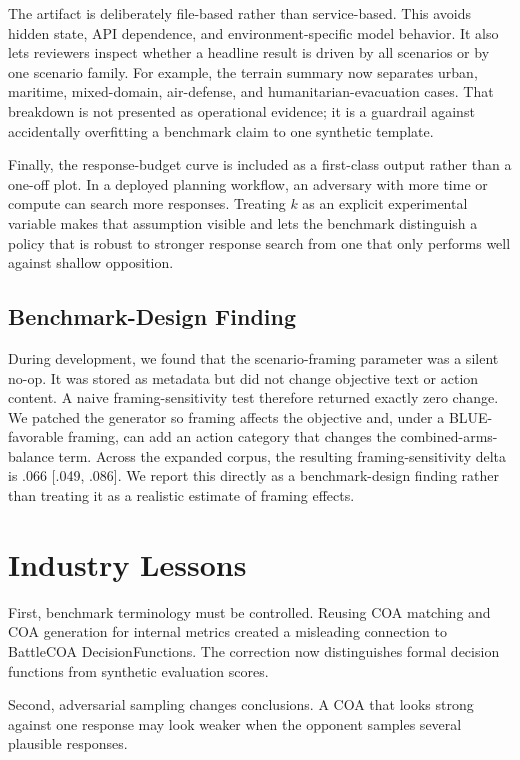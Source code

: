 \documentclass[sigconf]{acmart}
\begin{document}
The artifact is deliberately file-based rather than service-based. This avoids hidden state, API dependence, and environment-specific model behavior. It also lets reviewers inspect whether a headline result is driven by all scenarios or by one scenario family. For example, the terrain summary now separates urban, maritime, mixed-domain, air-defense, and humanitarian-evacuation cases. That breakdown is not presented as operational evidence; it is a guardrail against accidentally overfitting a benchmark claim to one synthetic template.

Finally, the response-budget curve is included as a first-class output rather than a one-off plot. In a deployed planning workflow, an adversary with more time or compute can search more responses. Treating $k$ as an explicit experimental variable makes that assumption visible and lets the benchmark distinguish a policy that is robust to stronger response search from one that only performs well against shallow opposition.

\subsection{Benchmark-Design Finding}

During development, we found that the scenario-framing parameter was a silent no-op. It was stored as metadata but did not change objective text or action content. A naive framing-sensitivity test therefore returned exactly zero change. We patched the generator so framing affects the objective and, under a BLUE-favorable framing, can add an action category that changes the combined-arms-balance term. Across the expanded corpus, the resulting framing-sensitivity delta is .066 [.049, .086]. We report this directly as a benchmark-design finding rather than treating it as a realistic estimate of framing effects.

\section{Industry Lessons}

First, benchmark terminology must be controlled. Reusing COA matching and COA generation for internal metrics created a misleading connection to BattleCOA DecisionFunctions. The correction now distinguishes formal decision functions from synthetic evaluation scores.

Second, adversarial sampling changes conclusions. A COA that looks strong against one response may look weaker when the opponent samples several plausible responses.
\end{document}
